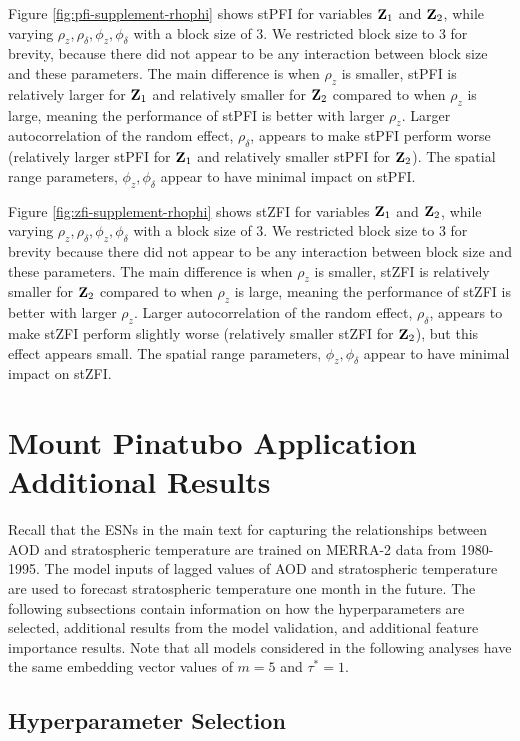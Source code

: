 \documentclass[AMS,STIX2COL]{WileyNJD-v2}
\begin{document}
Figure \ref{fig:pfi-supplement-rhophi} shows stPFI for variables ${\bf Z}_1$ and ${\bf Z}_2$, while varying $\rho_z,\rho_{\delta},\phi_z,\phi_{\delta}$ with a block size of 3. We restricted block size to 3 for brevity, because there did not appear to be any interaction between block size and these parameters. The main difference is when $\rho_z$ is smaller, stPFI is relatively larger for ${\bf Z}_1$ and relatively smaller for ${\bf Z}_2$ compared to when $\rho_z$ is large, meaning the performance of stPFI is better with larger $\rho_z$. Larger autocorrelation of the random effect, $\rho_{\delta}$, appears to make stPFI perform worse (relatively larger stPFI for ${\bf Z}_1$ and relatively smaller stPFI for ${\bf Z}_2$). The spatial range parameters, $\phi_z,\phi_{\delta}$ appear to have minimal impact on stPFI.

Figure \ref{fig:zfi-supplement-rhophi} shows stZFI for variables ${\bf Z}_1$ and ${\bf Z}_2$, while varying $\rho_z,\rho_{\delta},\phi_z,\phi_{\delta}$ with a block size of 3. We restricted block size to 3 for brevity because there did not appear to be any interaction between block size and these parameters. The main difference is when $\rho_z$ is smaller, stZFI is relatively smaller for ${\bf Z}_2$ compared to when $\rho_z$ is large, meaning the performance of stZFI is better with larger $\rho_z$. Larger autocorrelation of the random effect, $\rho_{\delta}$, appears to make stZFI perform slightly worse (relatively smaller stZFI for ${\bf Z}_2$), but this effect appears small. The spatial range parameters, $\phi_z,\phi_{\delta}$ appear to have minimal impact on stZFI.

\section{Mount Pinatubo Application Additional Results}

Recall that the ESNs in the main text for capturing the relationships between AOD and stratospheric temperature are trained on MERRA-2 data from 1980-1995. The model inputs of lagged values of AOD and stratospheric temperature are used to forecast stratospheric temperature one month in the future. The following subsections contain information on how the hyperparameters are selected, additional results from the model validation, and additional feature importance results. Note that all models considered in the following analyses have the same embedding vector values of $m=5$ and $\tau^*=1$.

\subsection{Hyperparameter Selection}
\end{document}
